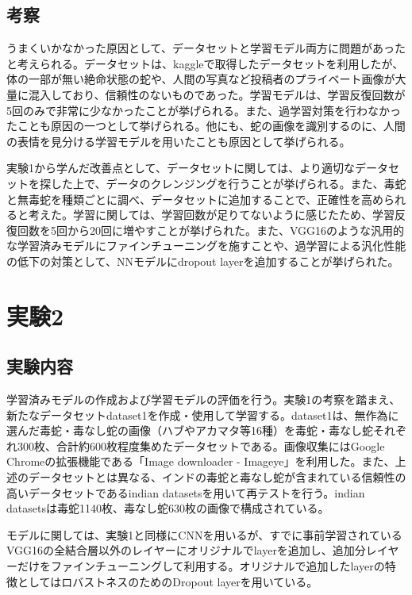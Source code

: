 \documentclass[a4paper, 11pt, titlepage]{jsarticle}
\begin{document}
\subsection{考察}
うまくいかなかった原因として、データセットと学習モデル両方に問題があったと考えられる。データセットは、kaggleで取得したデータセットを利用したが、体の一部が無い絶命状態の蛇や、人間の写真など投稿者のプライベート画像が大量に混入しており、信頼性のないものであった。学習モデルは、学習反復回数が5回のみで非常に少なかったことが挙げられる。また、過学習対策を行わなかったことも原因の一つとして挙げられる。他にも、蛇の画像を識別するのに、人間の表情を見分ける学習モデルを用いたことも原因として挙げられる。\par
実験1から学んだ改善点として、データセットに関しては、より適切なデータセットを探した上で、データのクレンジングを行うことが挙げられる。また、毒蛇と無毒蛇を種類ごとに調べ、データセットに追加することで、正確性を高められると考えた。学習に関しては、学習回数が足りてないように感じたため、学習反復回数を5回から20回に増やすことが挙げられた。また、VGG16のような汎用的な学習済みモデルにファインチューニングを施すことや、過学習による汎化性能の低下の対策として、NNモデルにdropout layerを追加することが挙げられた。\par

\section{実験2}
\subsection{実験内容}
学習済みモデルの作成および学習モデルの評価を行う。実験1の考察を踏まえ、新たなデータセットdataset1を作成・使用して学習する。dataset1は、無作為に選んだ毒蛇・毒なし蛇の画像（ハブやアカマタ等16種）を毒蛇・毒なし蛇それぞれ300枚、合計約600枚程度集めたデータセットである。画像収集にはGoogle Chromeの拡張機能である「Image downloader - Imageye」を利用した。また、上述のデータセットとは異なる、インドの毒蛇と毒なし蛇が含まれている信頼性の高いデータセットであるindian datasets\cite{theme5}を用いて再テストを行う。indian datasetsは毒蛇1140枚、毒なし蛇630枚の画像で構成されている。\par
モデルに関しては、実験1と同様にCNNを用いるが、すでに事前学習されているVGG16の全結合層以外のレイヤーにオリジナルでlayerを追加し、追加分レイヤーだけをファインチューニングして利用する。オリジナルで追加したlayerの特徴としてはロバストネスのためのDropout layerを用いている。\par
\end{document}
